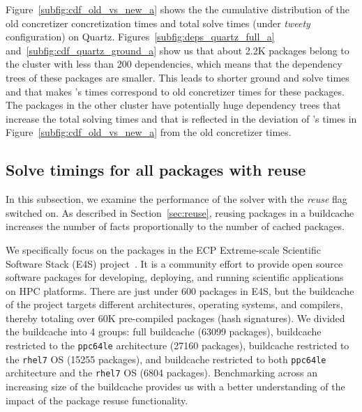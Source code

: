 Figure~\ref{subfig:cdf_old_vs_new_a} shows the the cumulative distribution of the old concretizer concretization times and \clingo{} total solve times (under \emph{tweety} configuration) on Quartz. Figures~\ref{subfig:deps_quartz_full_a} and~\ref{subfig:cdf_quartz_ground_a} show us that about 2.2K packages belong to the cluster with less than 200 dependencies, which means that the dependency trees of these packages are smaller. This leads to shorter ground and solve times and that makes \clingo{}'s times correspond to old concretizer times for these packages. The packages in the other cluster have potentially huge dependency trees that increase the total solving times and that is reflected in the deviation of \clingo{}'s times in Figure~\ref{subfig:cdf_old_vs_new_a} from the old concretizer times.


\subsection{Solve timings for all packages with reuse}

In this subsection, we examine the performance of the solver with the \emph{reuse} flag switched on. As described in Section~\ref{sec:reuse}, reusing packages in a buildcache increases the number of facts proportionally to the number of cached packages.

% 

% 

We specifically focus on the packages in the ECP Extreme-scale Scientific Software Stack (E4S) project~\cite{e4s}. It is a community effort to provide open source software packages for developing, deploying, and running scientific applications on HPC platforms. There are just under 600 packages in E4S, but the buildcache of the project targets different architectures, operating systems, and compilers, thereby totaling over 60K pre-compiled packages (hash signatures). We divided the buildcache into 4 groups: full buildcache (63099 packages), buildcache restricted to the \texttt{ppc64le} architecture (27160 packages), buildcache restricted to the \texttt{rhel7} OS (15255 packages), and buildcache restricted to both \texttt{ppc64le} architecture and the \texttt{rhel7} OS (6804 packages). Benchmarking across an increasing size of the buildcache provides us with a better understanding of the impact of the package resuse functionality.

